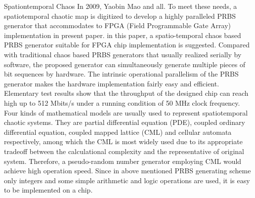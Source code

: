 Spationtemporal Chaos
In 2009, Yaobin Mao and all. To meet these needs, a spatiotemporal chaotic map is digitized to develop a highly paralleled PRBS generator that accommodates to FPGA (Field Programmable Gate Array) implementation in present paper. in this paper, a spatio-temporal chaos based PRBS generator suitable for FPGA chip implementation is suggested. Compared with traditional chaos based PRBS generators that usually realized serially by software, the proposed generator can simultaneously generate multiple pieces of bit sequences by hardware. The intrinsic operational parallelism of the PRBS generator makes the hardware implementation fairly easy and efficient. Elementary test results show that the throughput of the designed chip can reach high up to 512 Mbits/s under a running condition of 50 MHz clock frequency. Four kinds of mathematical models are usually used to represent spatiotemporal chaotic systems. They are partial differential equation (PDE), coupled ordinary differential equation, coupled mapped lattice (CML) and cellular automata respectively, among which the CML is most widely used due to its appropriate tradeoff between the calculational complexity and the representative of original system. Therefore, a pseudo-random number generator employing CML would achieve high operation speed. Since in above mentioned PRBS generating scheme only integers and some simple arithmetic and logic operations are used, it is easy to be implemented on a chip. 

